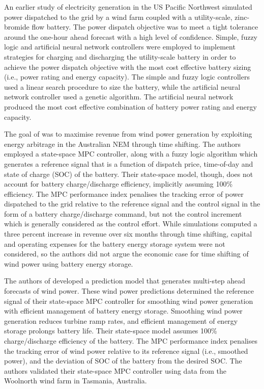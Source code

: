 \documentclass[a4paper, 10pt, twocolumn, preprint, 3p]{elsarticle}
\begin{document}
An earlier study \cite{BYJYHH11} of electricity generation in the US Pacific Northwest simulated power dispatched to the grid by a wind farm coupled with a utility-scale, zinc-bromide flow battery.  The power dispatch objective was to meet a tight tolerance around the one-hour ahead forecast with a high level of confidence.  Simple, fuzzy logic and artificial neural network controllers were employed to implement strategies for charging and discharging the utility-scale battery in order to achieve the power dispatch objective with the most cost effective battery sizing (i.e., power rating and energy capacity).  The simple and fuzzy logic controllers used a linear search procedure to size the battery, while the artificial neural network controller used a genetic algorithm.  The artificial neural network produced the most cost effective combination of battery power rating and energy capacity.

The goal of \cite{KKSA13} was to maximise revenue from wind power generation by exploiting energy arbitrage in the Australian NEM through time shifting.  The authors employed a state-space MPC controller, along with a fuzzy logic algorithm which generates a reference signal that is a function of dispatch price, time-of-day and state of charge (SOC) of the battery.  Their state-space model, though, does not account for battery charge/discharge efficiency, implicitly assuming 100\% efficiency.  The MPC performance index penalises the tracking error of power dispatched to the grid relative to the reference signal and the control signal in the form of a battery charge/discharge command, but not the control increment which is generally considered as the control effort.  While simulations computed a three percent increase in revenue over six months through time shifting, capital and operating expenses for the battery energy storage system were not considered, so the authors did not argue the economic case for time shifting of wind power using battery energy storage.

The authors of \cite{KS10} developed a prediction model that generates multi-step ahead forecasts of wind power.  These wind power predictions determined the reference signal of their state-space MPC controller for smoothing wind power generation with efficient management of battery energy storage.  Smoothing wind power generation reduces turbine ramp rates, and efficient management of energy storage prolongs battery life.  Their state-space model assumes 100\% charge/discharge efficiency of the battery.  The MPC performance index penalises the tracking error of wind power relative to its reference signal (i.e., smoothed power), and the deviation of SOC of the battery from the desired SOC.  The authors validated their state-space MPC controller using data from the Woolnorth wind farm in Tasmania, Australia.
\end{document}
